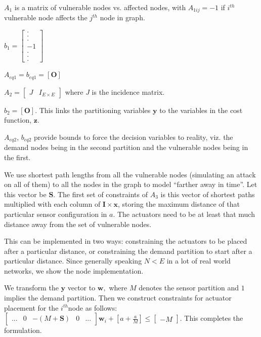 \documentclass[authoryear,preprint,review,12pt]{elsarticle}
\begin{document}
$A_{1}$ is a matrix of vulnerable nodes vs. affected nodes, with
$A_{1ij}=-1$ if $i^{th}$ vulnerable node affects the $j^{th}$ node
in graph.

$b_{1}=\left[\begin{array}{c}
.\\
.\\
.\\
-1\\
.\\
.\\
.
\end{array}\right]$

$A_{eq1}=b_{eq1}=\mathbf{\left[O\right]}$

$A_{2}=\left[\begin{array}{cc}
J & I_{E\times E}\end{array}\right]$ where $J$ is the incidence matrix.

$b_{2}=\left[\mathbf{O}\right]$. This links the partitioning variables
$\mathbf{y}$ to the variables in the cost function, $\mathbf{z}$.

$A_{eq2}$, $b_{eq2}$ provide bounds to force the decision variables
to reality, viz. the demand nodes being in the second partition and
the vulnerable nodes being in the first.

We use shortest path lengths from all the vulnerable nodes (simulating
an attack on all of them) to all the nodes in the graph to model ``farther
away in time''. Let this vector be $\mathbf{S}$. The first set of
constraints of $A_{3}$ is this vector of shortest paths multiplied
with each column of $\mathbf{I\times x}$, storing the maximum distance
of that particular sensor configuration in $a$. The actuators need
to be at least that much distance away from the set of vulnerable
nodes.

This can be implemented in two ways: constraining the actuators to
be placed after a particular distance, or constraining the demand
partition to start after a particular distance. Since generally speaking
$N<E$ in a lot of real world networks, we show the node implementation.

We transform the $\mathbf{y}$ vector to $\mathbf{w},$ where $M$
denotes the sensor partition and $1$ implies the demand partition.
Then we construct constraints for actuator placement for the $i^{th}$node
as follows: $\left[\begin{array}{ccccc}
... & 0 & -(M+\mathbf{S}) & 0 & ...\end{array}\right]\mathbf{w}_{i}+\left[a+\frac{a}{M}\right]\leq\left[\begin{array}{c}
-M\end{array}\right]$. This completes the formulation.
\end{document}
